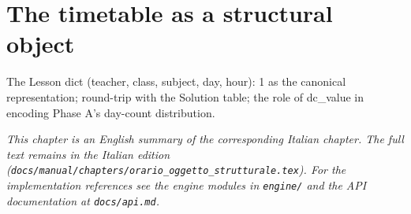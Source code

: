 \chapter{The timetable as a structural object}
\label{ch:orario_oggetto_strutturale_en}

The Lesson dict {(teacher, class, subject, day, hour): 1} as the canonical representation; round-trip with the Solution table; the role of dc_value in encoding Phase A's day-count distribution.

\medskip
\noindent
\textit{This chapter is an English summary of the corresponding Italian chapter. The full text remains in the Italian edition (\texttt{docs/manual/chapters/orario\_oggetto\_strutturale.tex}). For the implementation references see the engine modules in \texttt{engine/} and the API documentation at \texttt{docs/api.md}.}
